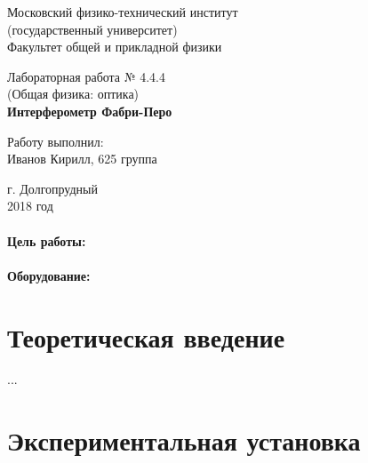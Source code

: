 \documentclass[12pt]{kiarticle}
\begin{document}
	
	\begin{titlepage}
	\begin{center}
		\large 	Московский физико-технический институт \\
		(государственный университет) \\
		Факультет общей и прикладной физики \\
		\vspace{0.2cm}
		
		\vspace{4.5cm}
		Лабораторная работа № 4.4.4 \\ \vspace{0.2cm}
		\large (Общая физика: оптика) \\ \vspace{0.2cm}
		\LARGE \textbf{Интерферометр Фабри-Перо}
	\end{center}
	\vspace{2.3cm} \large
	
	\begin{center}
		Работу выполнил: \\
		Иванов Кирилл,
		625 группа
		\vspace{10mm}		
		
	\end{center}
	
	\begin{center} \vspace{60mm}
		г. Долгопрудный \\
		2018 год
	\end{center}
\end{titlepage}
	
	\paragraph*{Цель работы:} 
	
	\paragraph*{Оборудование:} 
	
	\section{Теоретическая введение}
	
	...
	
	\section{Экспериментальная установка}
	
\end{document}
